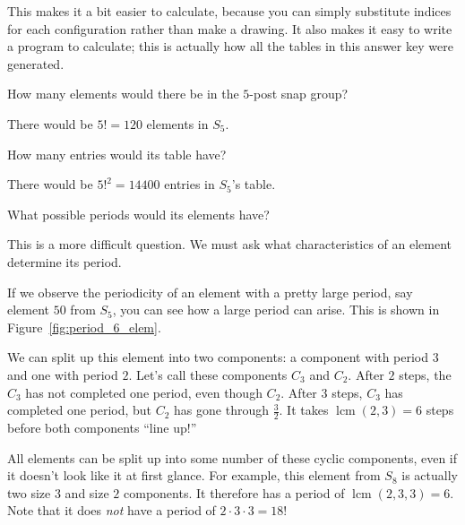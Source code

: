\documentclass[../gatm_answers.tex]{subfiles}
\begin{document}
This makes it a bit easier to calculate, because you can simply substitute indices for each configuration rather than make a drawing. It also makes it easy to write a program to calculate; this is actually how all the tables in this answer key were generated.

\begin{outer_problem}
	\item 
\end{outer_problem}

\begin{inner_problem}[start=0]
	 \item How many elements would there be in the $5$-post snap group? \label{prob:five_post_snap_list_start}
\end{inner_problem}

There would be $5!=120$ elements in $S_5$.

\begin{inner_problem}
	\item How many entries would its table have?
\end{inner_problem}

There would be $5!^2=14400$ entries in $S_5$'s table.

\begin{inner_problem}
	\item What possible periods would its elements have? \label{prob:five_post_snap_list_end}
\end{inner_problem}

This is a more difficult question. We must ask what characteristics of an element determine its period.

If we observe the periodicity of an element with a pretty large period, say element $50$ from $S_5$, you can see how a large period can arise. This is shown in Figure~\ref{fig:period_6_elem}.

We can split up this element into two components: a component with period $3$ and one with period $2$. Let's call these components $C_3$ and $C_2$. After $2$ steps, the $C_3$ has not completed one period, even though $C_2$. After $3$ steps, $C_3$ has completed one period, but $C_2$ has gone through $\frac{3}{2}$. It takes $\operatorname{lcm}(2,3) = 6$ steps before both components ``line up!''

All elements can be split up into some number of these cyclic components, even if it doesn't look like it at first glance. For example, this element from $S_8$ is actually two size $3$ and size $2$ components. It therefore has a period of $\operatorname{lcm}(2,3,3)=6$. Note that it does \textit{not} have a period of $2\cdot 3\cdot 3 = 18$!
\end{document}
